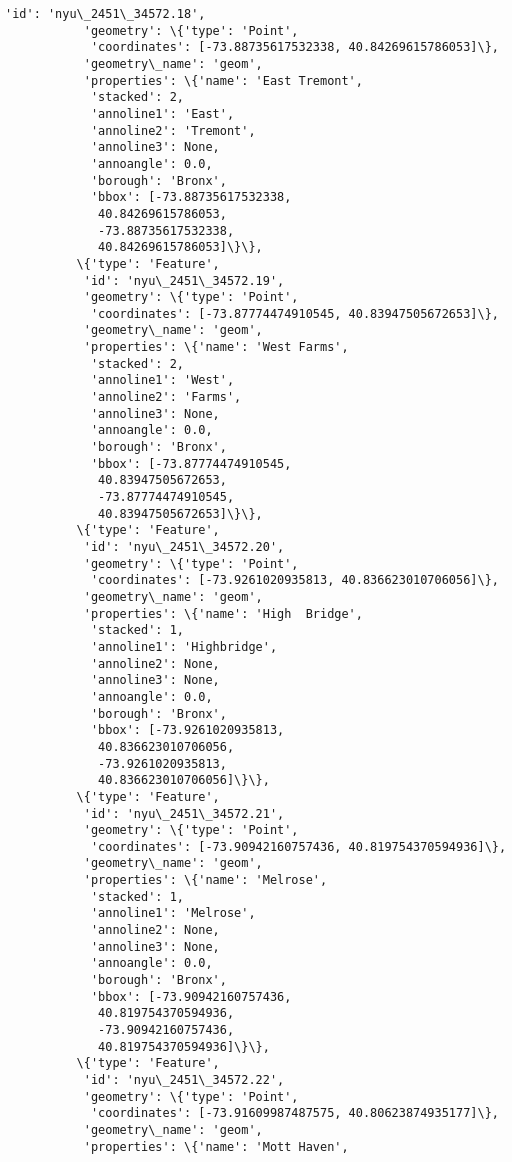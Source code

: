 \documentclass[11pt]{article}
\begin{document}
\begin{Verbatim}[commandchars=\\\{\}]
           'id': 'nyu\_2451\_34572.18',
           'geometry': \{'type': 'Point',
            'coordinates': [-73.88735617532338, 40.84269615786053]\},
           'geometry\_name': 'geom',
           'properties': \{'name': 'East Tremont',
            'stacked': 2,
            'annoline1': 'East',
            'annoline2': 'Tremont',
            'annoline3': None,
            'annoangle': 0.0,
            'borough': 'Bronx',
            'bbox': [-73.88735617532338,
             40.84269615786053,
             -73.88735617532338,
             40.84269615786053]\}\},
          \{'type': 'Feature',
           'id': 'nyu\_2451\_34572.19',
           'geometry': \{'type': 'Point',
            'coordinates': [-73.87774474910545, 40.83947505672653]\},
           'geometry\_name': 'geom',
           'properties': \{'name': 'West Farms',
            'stacked': 2,
            'annoline1': 'West',
            'annoline2': 'Farms',
            'annoline3': None,
            'annoangle': 0.0,
            'borough': 'Bronx',
            'bbox': [-73.87774474910545,
             40.83947505672653,
             -73.87774474910545,
             40.83947505672653]\}\},
          \{'type': 'Feature',
           'id': 'nyu\_2451\_34572.20',
           'geometry': \{'type': 'Point',
            'coordinates': [-73.9261020935813, 40.836623010706056]\},
           'geometry\_name': 'geom',
           'properties': \{'name': 'High  Bridge',
            'stacked': 1,
            'annoline1': 'Highbridge',
            'annoline2': None,
            'annoline3': None,
            'annoangle': 0.0,
            'borough': 'Bronx',
            'bbox': [-73.9261020935813,
             40.836623010706056,
             -73.9261020935813,
             40.836623010706056]\}\},
          \{'type': 'Feature',
           'id': 'nyu\_2451\_34572.21',
           'geometry': \{'type': 'Point',
            'coordinates': [-73.90942160757436, 40.819754370594936]\},
           'geometry\_name': 'geom',
           'properties': \{'name': 'Melrose',
            'stacked': 1,
            'annoline1': 'Melrose',
            'annoline2': None,
            'annoline3': None,
            'annoangle': 0.0,
            'borough': 'Bronx',
            'bbox': [-73.90942160757436,
             40.819754370594936,
             -73.90942160757436,
             40.819754370594936]\}\},
          \{'type': 'Feature',
           'id': 'nyu\_2451\_34572.22',
           'geometry': \{'type': 'Point',
            'coordinates': [-73.91609987487575, 40.80623874935177]\},
           'geometry\_name': 'geom',
           'properties': \{'name': 'Mott Haven',

\end{Verbatim}
\end{document}

